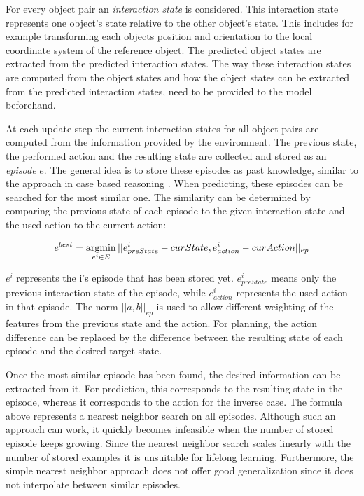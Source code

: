 For every object pair an \textit{interaction state} is considered. This interaction state represents one object's state relative to the other object's state. This includes for example transforming each objects position and orientation to the local coordinate system of the reference object. %
The predicted object states are extracted from the predicted interaction states. The way these interaction states are computed from the object states and how the object states can be extracted from the predicted interaction states, need to be provided to the model beforehand. %

At each update step the current interaction states for all object pairs are computed from the information provided by the environment. The previous state, the performed action and the resulting state are collected and stored as an \textit{episode} $e$. The general idea is to store these episodes as past knowledge, similar to the approach in case based reasoning \cite{cbr}. When predicting, these episodes can be searched for the most similar one. The similarity can be determined by comparing the previous state of each episode to the given interaction state and the used action to the current action:

\begin{equation}
e^{best} = \argmin_{e^i \in E} ||e^i_{preState}-curState, e^i_{action}-curAction||_{ep}
\label{eq:bestEpisode}
\end{equation}


$e^i$ represents the i's episode that has been stored yet. $e^i_{preState}$ means only the previous interaction state of the episode, while $e^i_{action}$ represents the used action in that episode.
The norm $||a,b||_{ep}$ is used to allow different weighting of the features from the previous state and the action. For planning, the action difference can be replaced by the difference between the resulting state of each episode and the desired target state.

Once the most similar episode has been found, the desired information can be extracted from it. For prediction, this corresponds to the resulting state in the episode, whereas it corresponds to the action for the inverse case. The formula above represents a nearest neighbor search on all episodes. Although such an approach can work, it quickly becomes infeasible when the number of stored episode keeps growing. Since the nearest neighbor search scales linearly with the number of stored examples it is unsuitable for lifelong learning. 
Furthermore, the simple nearest neighbor approach does not offer good generalization since it does not interpolate between similar episodes. 

